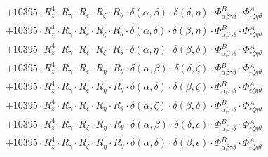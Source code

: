 \documentclass{article}
\begin{document}
\begin{equation}
\begin{array}{c}
 \\[0.2em] 		 + 10395 \cdot R_{z}^{4} \cdot R_{\gamma{}} \cdot R_{\epsilon{}} \cdot R_{\zeta{}} \cdot R_{\theta{}} \cdot \delta{}\left(\alpha{}, \beta{}\right) \cdot \delta{}\left(\delta{}, \eta{}\right) \cdot \Phi{}^{B}_{\alpha{}\beta{}\gamma{}\delta{}} \cdot \Phi{}^{A}_{\epsilon{}\zeta{}\eta{}\theta{}} 
 \\[0.2em] 		 + 10395 \cdot R_{z}^{4} \cdot R_{\gamma{}} \cdot R_{\epsilon{}} \cdot R_{\zeta{}} \cdot R_{\theta{}} \cdot \delta{}\left(\alpha{}, \delta{}\right) \cdot \delta{}\left(\beta{}, \eta{}\right) \cdot \Phi{}^{B}_{\alpha{}\beta{}\gamma{}\delta{}} \cdot \Phi{}^{A}_{\epsilon{}\zeta{}\eta{}\theta{}} 
 \\[0.2em] 		 + 10395 \cdot R_{z}^{4} \cdot R_{\gamma{}} \cdot R_{\epsilon{}} \cdot R_{\zeta{}} \cdot R_{\theta{}} \cdot \delta{}\left(\alpha{}, \eta{}\right) \cdot \delta{}\left(\beta{}, \delta{}\right) \cdot \Phi{}^{B}_{\alpha{}\beta{}\gamma{}\delta{}} \cdot \Phi{}^{A}_{\epsilon{}\zeta{}\eta{}\theta{}} 
 \\[0.2em] 		 + 10395 \cdot R_{z}^{4} \cdot R_{\gamma{}} \cdot R_{\epsilon{}} \cdot R_{\eta{}} \cdot R_{\theta{}} \cdot \delta{}\left(\alpha{}, \beta{}\right) \cdot \delta{}\left(\delta{}, \zeta{}\right) \cdot \Phi{}^{B}_{\alpha{}\beta{}\gamma{}\delta{}} \cdot \Phi{}^{A}_{\epsilon{}\zeta{}\eta{}\theta{}} 
 \\[0.2em] 		 + 10395 \cdot R_{z}^{4} \cdot R_{\gamma{}} \cdot R_{\epsilon{}} \cdot R_{\eta{}} \cdot R_{\theta{}} \cdot \delta{}\left(\alpha{}, \delta{}\right) \cdot \delta{}\left(\beta{}, \zeta{}\right) \cdot \Phi{}^{B}_{\alpha{}\beta{}\gamma{}\delta{}} \cdot \Phi{}^{A}_{\epsilon{}\zeta{}\eta{}\theta{}} 
 \\[0.2em] 		 + 10395 \cdot R_{z}^{4} \cdot R_{\gamma{}} \cdot R_{\epsilon{}} \cdot R_{\eta{}} \cdot R_{\theta{}} \cdot \delta{}\left(\alpha{}, \zeta{}\right) \cdot \delta{}\left(\beta{}, \delta{}\right) \cdot \Phi{}^{B}_{\alpha{}\beta{}\gamma{}\delta{}} \cdot \Phi{}^{A}_{\epsilon{}\zeta{}\eta{}\theta{}} 
 \\[0.2em] 		 + 10395 \cdot R_{z}^{4} \cdot R_{\gamma{}} \cdot R_{\zeta{}} \cdot R_{\eta{}} \cdot R_{\theta{}} \cdot \delta{}\left(\alpha{}, \beta{}\right) \cdot \delta{}\left(\delta{}, \epsilon{}\right) \cdot \Phi{}^{B}_{\alpha{}\beta{}\gamma{}\delta{}} \cdot \Phi{}^{A}_{\epsilon{}\zeta{}\eta{}\theta{}} 
 \\[0.2em] 		 + 10395 \cdot R_{z}^{4} \cdot R_{\gamma{}} \cdot R_{\zeta{}} \cdot R_{\eta{}} \cdot R_{\theta{}} \cdot \delta{}\left(\alpha{}, \delta{}\right) \cdot \delta{}\left(\beta{}, \epsilon{}\right) \cdot \Phi{}^{B}_{\alpha{}\beta{}\gamma{}\delta{}} \cdot \Phi{}^{A}_{\epsilon{}\zeta{}\eta{}\theta{}} 

\end{array}
\end{equation}
\end{document}
